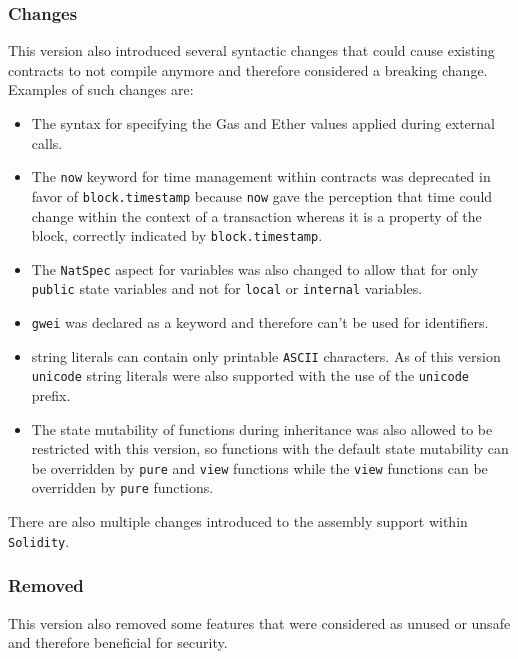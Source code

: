 \subsubsection{Changes}\label{changes-1}

This version also introduced several syntactic changes that could cause
existing contracts to not compile anymore and therefore considered a
breaking change. Examples of such changes are:

\begin{itemize}
\tightlist
\item
  The syntax for specifying the Gas and Ether values applied during
  external calls.
\item
  The \texttt{now} keyword for time management within contracts was
  deprecated in favor of \texttt{block.timestamp} because \texttt{now}
  gave the perception that time could change within the context of a
  transaction whereas it is a property of the block, correctly indicated
  by \texttt{block.timestamp}.
\item
  The \texttt{NatSpec} aspect for variables was also changed to allow
  that for only \texttt{public} state variables and not for
  \texttt{local} or \texttt{internal} variables.
\item
  \texttt{gwei} was declared as a keyword and therefore can't be used
  for identifiers.
\item
  string literals can contain only printable \texttt{ASCII} characters.
  As of this version \texttt{unicode} string literals were also
  supported with the use of the \texttt{unicode} prefix.
\item
  The state mutability of functions during inheritance was also allowed
  to be restricted with this version, so functions with the default
  state mutability can be overridden by \texttt{pure} and \texttt{view}
  functions while the \texttt{view} functions can be overridden by
  \texttt{pure} functions.
\end{itemize}

There are also multiple changes introduced to the assembly support
within \texttt{Solidity}.

\subsubsection{Removed}\label{removed}

This version also removed some features that were considered as unused
or unsafe and therefore beneficial for security.


